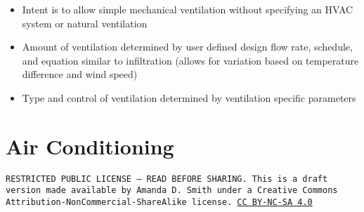 \documentclass[10pt]{article}
\begin{document}
\vspace{-6pt}
\begin{itemize}
    \setlength{\itemsep}{0pt}%
    \setlength{\parskip}{0pt}%
    \item Intent is to allow simple mechanical ventilation without specifying an HVAC system or natural ventilation
    \item Amount of ventilation determined by user defined design flow rate, schedule, and equation similar to infiltration (allows for variation based on temperature difference and wind speed)
    \item Type and control of ventilation determined by ventilation specific parameters
\end{itemize}
\vspace{-6pt}



\section{Air Conditioning}

\bigskip

\noindent
\texttt{\footnotesize RESTRICTED PUBLIC LICENSE --- READ BEFORE SHARING. This is a draft version made available by Amanda D. Smith under a Creative Commons Attribution-NonCommercial-ShareAlike license. 
\href{https://creativecommons.org/licenses/by-nc-sa/4.0/}{CC BY-NC-SA 4.0}}

\newpage
\printbibliography
\end{document}
